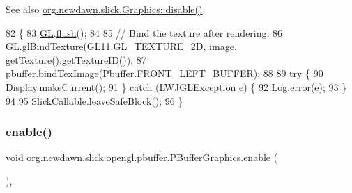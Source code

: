 \begin{DoxySeeAlso}{See also}
\mbox{\hyperlink{classorg_1_1newdawn_1_1slick_1_1_graphics_a7979c584c48fc28175289e0012d5c943}{org.\+newdawn.\+slick.\+Graphics\+::disable()}} 
\end{DoxySeeAlso}

\begin{DoxyCode}
82                              \{
83         \mbox{\hyperlink{classorg_1_1newdawn_1_1slick_1_1_graphics_a39ca68db81b225982a4421c4a6835eed}{GL}}.\mbox{\hyperlink{interfaceorg_1_1newdawn_1_1slick_1_1opengl_1_1renderer_1_1_s_g_l_a97c40969d74b57d2df86421d53b9c55c}{flush}}();
84         
85         \textcolor{comment}{// Bind the texture after rendering.}
86         \mbox{\hyperlink{classorg_1_1newdawn_1_1slick_1_1_graphics_a39ca68db81b225982a4421c4a6835eed}{GL}}.\mbox{\hyperlink{interfaceorg_1_1newdawn_1_1slick_1_1opengl_1_1renderer_1_1_s_g_l_a7b546bba69c511f7d96d055ac1ed6a21}{glBindTexture}}(GL11.GL\_TEXTURE\_2D, \mbox{\hyperlink{classorg_1_1newdawn_1_1slick_1_1opengl_1_1pbuffer_1_1_p_buffer_graphics_add068041cc793fa55a4019603b988d72}{image}}.
      \mbox{\hyperlink{classorg_1_1newdawn_1_1slick_1_1_image_a9c033386a3dcbb5e2f2ae2354e06d5bd}{getTexture}}().\mbox{\hyperlink{interfaceorg_1_1newdawn_1_1slick_1_1opengl_1_1_texture_a0d846c1cfcc66768db002d4eb06ad841}{getTextureID}}());
87         \mbox{\hyperlink{classorg_1_1newdawn_1_1slick_1_1opengl_1_1pbuffer_1_1_p_buffer_graphics_a47f309800a09ac31cb98a42398dd7e7d}{pbuffer}}.bindTexImage(Pbuffer.FRONT\_LEFT\_BUFFER);
88         
89         \textcolor{keywordflow}{try} \{
90             Display.makeCurrent();
91         \} \textcolor{keywordflow}{catch} (LWJGLException e) \{
92             Log.error(e);
93         \}
94         
95         SlickCallable.leaveSafeBlock();
96     \}
\end{DoxyCode}
\mbox{\label{classorg_1_1newdawn_1_1slick_1_1opengl_1_1pbuffer_1_1_p_buffer_graphics_af8acbb10f795d56cf003552cff5c6278}} 
\subsubsection{\texorpdfstring{enable()}{enable()}}
{\footnotesize\ttfamily void org.\+newdawn.\+slick.\+opengl.\+pbuffer.\+P\+Buffer\+Graphics.\+enable (\begin{DoxyParamCaption}{ }\end{DoxyParamCaption})\hspace{0.3cm}{\ttfamily [inline]}, {\ttfamily [protected]}}

